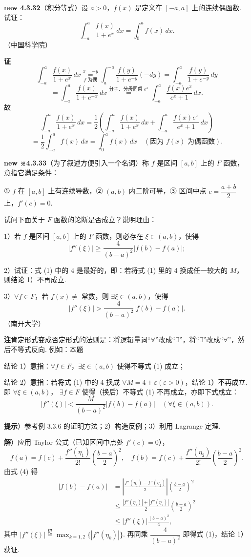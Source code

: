 \documentclass[UTF8,12pt,a4paper,fontset=fandol]{ctexart}
\begin{document}
\noindent\textbf{new 4.3.32}\quad（积分等式）设 $a>0$，$f(x)$ 是定义在 $[-a,a]$ 上的连续偶函数. 试证：
\[
\int_{-a}^a\frac{f(x)}{1+e^x}\,dx=\int_0^a f(x)\,dx.
\]
（中国科学院）

\noindent\textbf{证}\quad
\[
\int_{-a}^a\frac{f(x)}{1+e^x}\,dx
\stackrel{x=-y}{\underset{f\text{ 为偶}}=}
\int_a^{-a}\frac{f(y)}{1+e^{-y}}(-dy)
=\int_{-a}^a\frac{f(y)}{1+e^{-y}}\,dy
\]
\[
=\int_{-a}^a\frac{f(x)}{1+e^{-x}}\,dx
\stackrel{\text{分子、分母同乘 }e^x}{=}
\int_{-a}^a\frac{f(x)e^x}{e^x+1}\,dx.
\]
故
\[
\int_{-a}^a\frac{f(x)}{1+e^x}\,dx
=\frac12\left(
\int_{-a}^a\frac{f(x)}{1+e^x}\,dx
+\int_{-a}^a\frac{f(x)e^x}{e^x+1}\,dx\right)
\]
\[
=\frac12\int_{-a}^a f(x)\,dx
=\int_0^a f(x)\,dx
\quad(\text{因为 }f(x)\text{ 为偶函数}).
\]

\noindent\textbf{new ※4.3.33}\quad（为了叙述方便引入一个名词）称 $f$ 是区间 $[a,b]$ 上的 $F$ 函数，意指它满足条件：

① $f$ 在 $[a,b]$ 上有连续导数，② $(a,b)$ 内二阶可导，③ 区间中点
$c=\dfrac{a+b}2$ 上，$f'(c)=0$.

试问下面关于 $F$ 函数的论断是否成立？说明理由：

1）若 $f$ 是区间 $[a,b]$ 上的 $F$ 函数，则必存在 $\xi\in(a,b)$，使得
\[
|f''(\xi)|\ge\frac4{(b-a)^2}|f(b)-f(a)|; \tag{1}
\]

2）试证：式 (1) 中的 4 是最好的，即：若将式 (1) 里的 4 换成任一较大的 $M$，则结论 1）不再成立.

3）$\forall f\in F$，若 $f(x)\ne$ 常数，则 $\exists\xi\in(a,b)$，使得
\[
|f''(\xi)|>\frac4{(b-a)^2}|f(b)-f(a)|. \tag{2}
\]
（南开大学）

\noindent\textbf{注}\quad 肯定形式变成否定形式的法则是：将逻辑量词“$\forall$”改成“$\exists$”，将“$\exists$”改成“$\forall$”，然后不等式反向. 例如：本题

结论 1）意指：$\forall f\in F$，$\exists\xi\in(a,b)$ 使得不等式 (1) 成立；

\noindent 结论 2）意指：若将式 (1) 中的 4 换成 $\forall M=4+\varepsilon(\varepsilon>0)$，结论 1）不再成立. 即 $\forall \xi\in(a,b)$，
$\exists f\in F$ 使得（换后）不等式 (1) 不再成立，亦即下式成立：
\[
|f''(\xi)|<\frac{M}{(b-a)^2}|f(b)-f(a)|\quad(\forall \xi\in(a,b)). \tag{3}
\]

\noindent\textbf{提示}）参考例 3.3.6 的证明方法；2）构造反例；3）利用 Lagrange 定理.

\noindent\textbf{解}）应用 Taylor 公式（已知区间中点处 $f'(c)=0$），
\[
f(a)=f(c)+\frac{f''(\eta_1)}{2!}\left(\frac{b-a}{2}\right)^2,\quad
f(b)=f(c)+\frac{f''(\eta_2)}{2!}\left(\frac{b-a}{2}\right)^2. \tag{4}
\]
由式 (4) 得
\[
\begin{aligned}
|f(b)-f(a)|
&=\left|\frac{f''(\eta_1)-f''(\eta_2)}2\right|
\left(\frac{b-a}{2}\right)^2\\
&\le \frac{|f''(\eta_1)|+|f''(\eta_2)|}{2}
\left(\frac{b-a}{2}\right)^2\\
&\le |f''(\xi)|\frac{(b-a)^2}{4},
\end{aligned}
\]
其中 $|f''(\xi)|\stackrel{\text{记}}{=}\max_{k=1,2}\{|f''(\eta_k)|\}$.
再同乘 $\dfrac4{(b-a)^2}$ 即得式 (1)，结论 1）获证.
\end{document}
